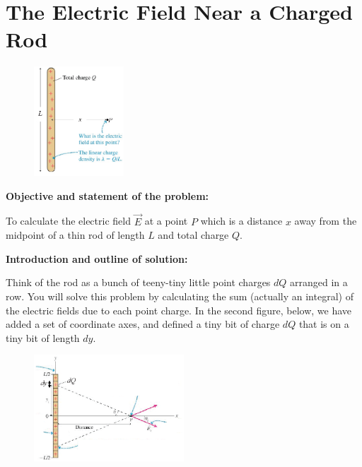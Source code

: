 \section{The Electric Field Near a Charged Rod}

\makelabheader %

\begin{figure}
    \includegraphics[width=0.3\textwidth]{electric_field_near_a_charged_rod/fig1.eps}
\end{figure}

\vspace{1cm}

\textbf{Objective and statement of the problem:}

To calculate the electric field $\vec{E}$ at a point $P$ which is a distance $x$ away from the midpoint of a thin rod
of length $L$ and total charge $Q$.

\vspace{1cm}

\textbf{Introduction and outline of solution:}

Think of the rod as a bunch of teeny-tiny little point charges $dQ$ arranged in a row. You will solve this problem by calculating the sum (actually an integral) of the electric fields due to each point charge.  In the second figure, below, we have added a set of coordinate axes, and defined a tiny bit of charge $dQ$ that is on a tiny bit of length $dy$.  
\par

\begin{figure}
\vspace{-23pt}
   \includegraphics[width=0.5\textwidth]{electric_field_near_a_charged_rod/fig2.eps}
\end{figure}

